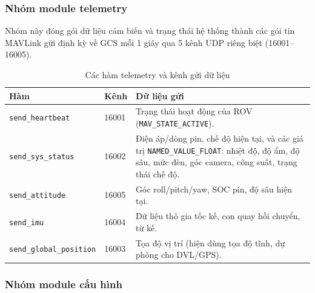 \documentclass[../DoAn.tex]{subfiles}
\begin{document}
\subsubsection{Nhóm module telemetry}

Nhóm này đóng gói dữ liệu cảm biến và trạng thái hệ thống thành các
gói tin MAVLink gửi định kỳ về GCS mỗi 1 giây qua 5 kênh UDP riêng
biệt (16001--16005).

\begin{table}[H]

\centering

\renewcommand{\arraystretch}{1.3}

\begin{tabular}{|l|l|p{6cm}|}

\hline

\textbf{Hàm} & \textbf{Kênh} & \textbf{Dữ liệu gửi} \\

\hline

\texttt{send\_heartbeat} & 16001 & Trạng thái hoạt động của ROV (\texttt{MAV\_STATE\_ACTIVE}). \\

\hline

\texttt{send\_sys\_status} & 16002 &
Điện áp/dòng pin, chế độ hiện tại, và các giá trị
\texttt{NAMED\_VALUE\_FLOAT}: nhiệt độ, độ ẩm, độ sâu,
mức đèn, góc camera, công suất, trạng thái chế độ. \\

\hline

\texttt{send\_attitude} & 16005 &
 Góc roll/pitch/yaw, SOC pin, độ sâu hiện tại. \\

\hline

\texttt{send\_imu} & 16004 &
Dữ liệu thô gia tốc kế, con quay hồi chuyển, từ kế. \\

\hline

\texttt{send\_global\_position} & 16003 &
Tọa độ vị trí (hiện dùng tọa độ tĩnh, dự phòng cho DVL/GPS). \\

\hline

\end{tabular}

\caption{Các hàm telemetry và kênh gửi dữ liệu}

\label{tab:telemetry_modules}

\end{table}

\subsubsection{Nhóm module cấu hình}
\end{document}
